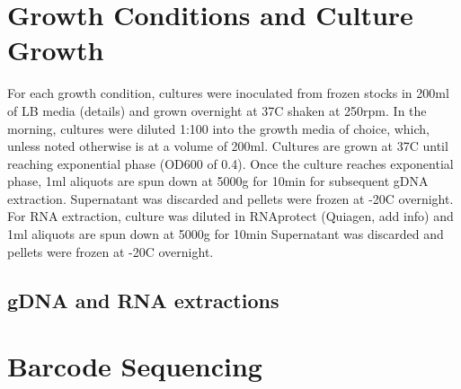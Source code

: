 \section{Growth Conditions and Culture Growth}
\label{sec:culture_growth}
For each growth condition, cultures were inoculated from frozen stocks in 200ml of LB media (details) and grown overnight at 37C shaken at 250rpm. In the morning, cultures were diluted 1:100 into the growth media of choice, which, unless noted otherwise is at a volume of 200ml. Cultures are grown at 37C until reaching exponential phase (OD600 of 0.4). Once the culture reaches exponential phase, 1ml aliquots are spun down at 5000g for 10min for subsequent gDNA extraction. Supernatant was discarded and pellets were frozen at -20C overnight. For RNA extraction, culture was diluted in RNAprotect (Quiagen, add info) and 1ml aliquots are spun down at 5000g for 10min Supernatant was discarded and pellets were frozen at -20C overnight.

\subsection{gDNA and RNA extractions}
\label{sec:dna_rna_extract}


\section{Barcode Sequencing}
\label{sec:barcode_seq}




